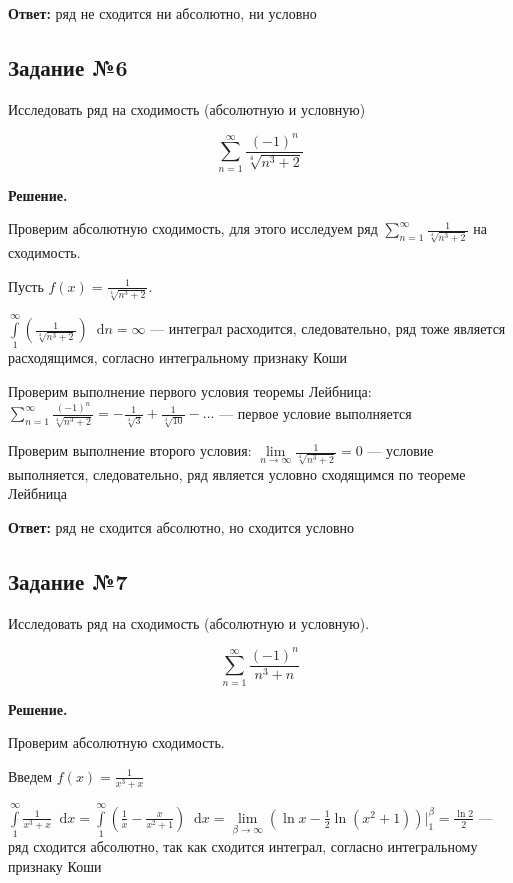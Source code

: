 \documentclass{article}
\newcommand*\diff{\mathop{}\!\mathrm{d}}
\begin{document}
\hfill

\textbf{Ответ:} ряд не сходится ни абсолютно, ни условно

\subsection{Задание №6}

Исследовать ряд на сходимость (абсолютную и условную)

$$
\sum\limits_{n = 1}^{\infty} \frac{(-1)^{n}}{\sqrt[4]{n^3 + 2}}
$$

\textbf{Решение.}

Проверим абсолютную сходимость, для этого исследуем ряд $\sum\limits_{n = 1}^{\infty} \frac{1}{\sqrt[4]{n^3 + 2}}$ на сходимость.

Пусть $f(x) = \frac{1}{\sqrt[4]{n^3 + 2}}$.

$\int\limits_{1}^{\infty} (\frac{1}{\sqrt[4]{n^3 + 2}}) \diff n = \infty$ — интеграл расходится, следовательно, ряд тоже является расходящимся, согласно интегральному признаку Коши

\hfill

Проверим выполнение первого условия теоремы Лейбница:
$\sum\limits_{n = 1}^{\infty} \frac{(-1)^{n}}{\sqrt[4]{n^3 + 2}} = - \frac{1}{\sqrt[4]{3}} + \frac{1}{\sqrt[4]{10}} - \dots$ — первое условие выполняется

Проверим выполнение второго условия: $\lim\limits_{n \to \infty} \frac{1}{\sqrt[4]{n^3 + 2}} = 0$ — условие выполняется, следовательно, ряд является условно сходящимся по теореме Лейбница

\hfill

\textbf{Ответ:} ряд не сходится абсолютно, но сходится условно

\subsection{Задание №7}

Исследовать ряд на сходимость (абсолютную и условную).

$$
\sum\limits_{n = 1}^{\infty} \frac{(-1)^{n}}{n^3 + n}
$$

\textbf{Решение.}

Проверим абсолютную сходимость.

Введем $f(x) = \frac{1}{x^3 + x}$

$\int\limits_{1}^{\infty} \frac{1}{x^3 + x} \diff x = \int\limits_{1}^{\infty} (\frac{1}{x} - \frac{x}{x^2 + 1}) \diff x = \lim\limits_{\beta \to \infty} (\ln x - \frac{1}{2} \ln (x^2 + 1)) \bigg|_{1}^{\beta} = \frac{\ln 2}{2}$ — ряд сходится абсолютно, так как сходится интеграл, согласно интегральному признаку Коши
\end{document}
